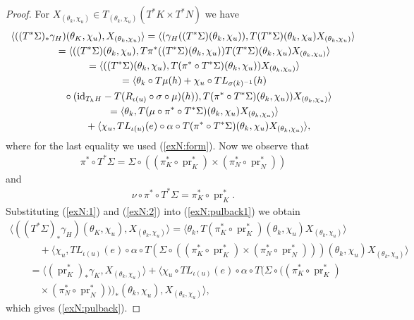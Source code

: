 \documentclass[pdftex]{sigma}
\newcommand{\id}{\text{\upshape id}}
\numberwithin{equation}{section}
\begin{document}
 \begin{proof}
 For $X_{(\theta_k,\chi_u)}\in T_{(\theta_k,\chi_u)}(T^*K\times T^*N)$ we have
\begin{gather}
 \langle((T^*\Sigma)_*\gamma_H)(\theta_K,\chi_u),X_{(\theta_k,\chi_u)}\rangle
 = \langle(\gamma_H((T^*\Sigma)(\theta_k,\chi_u)),T(T^*\Sigma)(\theta_k,\chi_u)X_{(\theta_k,\chi_u)}\rangle\nonumber\\
 \qquad{} =\langle((T^*\Sigma)(\theta_k,\chi_u),
 T\pi^*((T^*\Sigma)(\theta_k,\chi_u))T(T^*\Sigma)(\theta_k,\chi_u)X_{(\theta_k,\chi_u)}\rangle\nonumber\\
 \qquad{} =\langle((T^*\Sigma)(\theta_k,\chi_u),
 T(\pi^*\circ T^*\Sigma)(\theta_k,\chi_u))X_{(\theta_k,\chi_u)}\rangle\nonumber\\
\qquad{} =\langle\theta_k\circ T\mu(h)+\chi_u\circ TL_{\sigma(k)^{-1}}(h)\nonumber\\
 \qquad\quad{} \circ(\id_{T_hH}-T(R_{\iota(u)}\circ\sigma\circ\mu)(h)),
 T(\pi^*\circ T^*\Sigma)(\theta_k,\chi_u))X_{(\theta_k,\chi_u)}\rangle\nonumber\\
 \qquad{} =\langle\theta_k,T(\mu\circ \pi^*\circ T^*\Sigma)(\theta_k,\chi_u)X_{(\theta_k,\chi_u)}\rangle\nonumber\\
 \qquad\quad{} +
 \langle \chi_u, TL_{\iota(u)}(e)\circ \alpha\circ T(\pi^*\circ T^*\Sigma)(\theta_k,\chi_u)X_{(\theta_k,\chi_u)}\rangle,\label{exN:pulback1}
\end{gather}
where for the last equality we used (\ref{exN:form}). Now we observe that
\begin{gather}\label{exN:1}
\pi^*\circ T^*\Sigma=\Sigma\circ((\pi^*_K\circ \operatorname{pr}_K^*)\times (\pi_N^*\circ \operatorname{pr}_N^*))
\end{gather}
and
\begin{gather}\label{exN:2}
\nu\circ \pi^*\circ T^*\Sigma=\pi^*_K\circ \operatorname{pr}^*_K.
\end{gather}
Substituting (\ref{exN:1}) and (\ref{exN:2}) into (\ref{exN:pulback1}) we obtain
\begin{gather*}
\langle((T^*\Sigma)_*\gamma_H)(\theta_K,\chi_u),X_{(\theta_k,\chi_u)}\rangle
=\langle\theta_k,T(\pi^*_K\circ \operatorname{pr}^*_K)(\theta_k,\chi_u)X_{(\theta_k,\chi_u)}\rangle\nonumber\\
\qquad\quad{} +\langle \chi_u, TL_{\iota(u)}(e)\circ \alpha\circ T(\Sigma\circ((\pi^*_K\circ \operatorname{pr}_K^*)\times (\pi_N^*\circ \operatorname{pr}_N^*)))(\theta_k,\chi_u)X_{(\theta_k,\chi_u)}\rangle\nonumber\\
\qquad{} =\langle(\operatorname{pr}_K^*)_*\gamma_K,X_{(\theta_k,\chi_u)}\rangle+\langle \chi_u\circ TL_{\iota(u)}(e)\circ \alpha\circ T(\Sigma\circ((\pi^*_K\circ \operatorname{pr}_K^*)\\
\qquad\quad{} \times (\pi_N^*\circ \operatorname{pr}_N^*)))_*(\theta_k,\chi_u),X_{(\theta_k,\chi_u)}\rangle,
\end{gather*}
which gives (\ref{exN:pulback}).
\end{proof}
\end{document}
